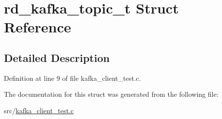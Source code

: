 \hypertarget{structrd__kafka__topic__t}{\section{rd\-\_\-kafka\-\_\-topic\-\_\-t Struct Reference}
\label{structrd__kafka__topic__t}
}


\subsection{Detailed Description}


Definition at line 9 of file kafka\-\_\-client\-\_\-test.\-c.



The documentation for this struct was generated from the following file\-:\begin{DoxyCompactItemize}
\item 
src/\hyperlink{kafka__client__test_8c}{kafka\-\_\-client\-\_\-test.\-c}\end{DoxyCompactItemize}
